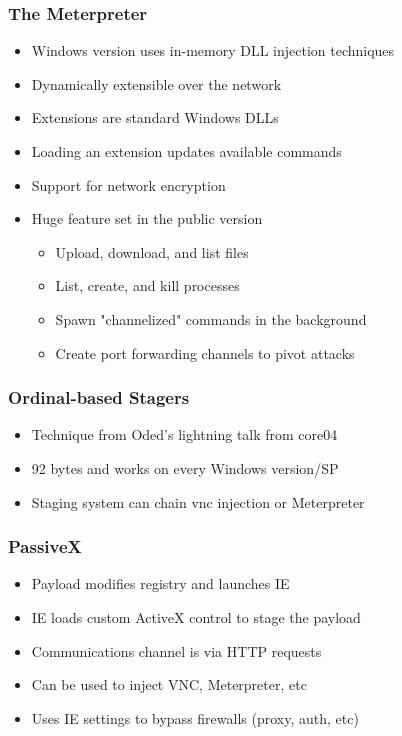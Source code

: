 \documentclass{beamer}
\begin{document}
\begin{frame}
	\frametitle{The Meterpreter}
	\begin{itemize}
		\item Windows version uses in-memory DLL injection techniques
		\item Dynamically extensible over the network
		\item Extensions are standard Windows DLLs
		\item Loading an extension updates available commands
		\item Support for network encryption
		\item Huge feature set in the public version
		\begin{itemize}
			\item Upload, download, and list files
			\item List, create, and kill processes
			\item Spawn "channelized" commands in the background
			\item Create port forwarding channels to pivot attacks
		\end{itemize}
	\end{itemize}	
\end{frame}

\begin{frame}
	\frametitle{Ordinal-based Stagers}
	\begin{itemize}
		\item Technique from Oded's lightning talk from core04
		\item 92 bytes and works on every Windows version/SP
		\item Staging system can chain vnc injection or Meterpreter
	\end{itemize}	
\end{frame}

\begin{frame}
	\frametitle{PassiveX}
	\begin{itemize}
		\item Payload modifies registry and launches IE
		\item IE loads custom ActiveX control to stage the payload
		\item Communications channel is via HTTP requests
		\item Can be used to inject VNC, Meterpreter, etc
		\item Uses IE settings to bypass firewalls (proxy, auth, etc)
	\end{itemize}	
\end{frame}
\end{document}
